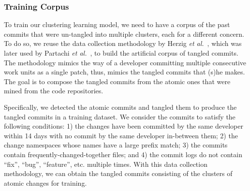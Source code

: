 \subsubsection{Training Corpus}

To train our clustering learning model, we need to have a corpus of
the past commits that were un-tangled into multiple clusters, each for
a different concern. To do so, we reuse the data collection
methodology by Herzig {\em et al.}~\cite{kim-emse16}, which was later
used by Partachi {\em et al.}~\cite{flexeme-fse20}, to build the
artificial corpus of tangled commits. The methodology mimics the way
of a developer committing multiple consecutive work units as a single
patch, thus, mimics the tangled commits that (s)he makes. The goal is
to compose the tangled commits from the atomic ones that were mined
from the code repositories.

Specifically, we detected the atomic commits and tangled them to
produce the tangled commits in a training dataset. We consider the
commits to satisfy the following conditions: 1) the changes have been
committed by the same developer within 14 days with no commit by the
same developer in-between them; 2) the change namespaces whose names
have a large prefix match; 3) the commits contain
frequently-changed-together files; and 4) the commit logs do not
contain ``fix'', ``bug'', ``feature'', etc. multiple times. With this
data collection methodology, we can obtain the tangled commits
consisting of the clusters of atomic changes for training.
